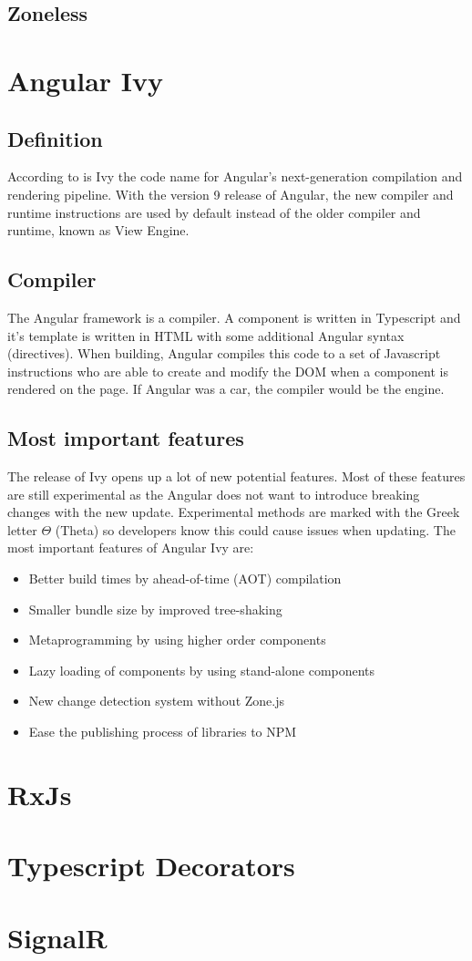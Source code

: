 \subsection{Zoneless}

\section{Angular Ivy}
\subsection{Definition}
According to \textcite{Angular.io-ivy} is Ivy the code name for Angular's next-generation compilation and rendering pipeline. With the version 9 release of Angular, the new compiler and runtime instructions are used by default instead of the older compiler and runtime, known as View Engine.

\subsection{Compiler}
The Angular framework is a compiler. A component is written in Typescript and it's template is written in HTML with some additional Angular syntax (directives). When building, Angular compiles this code to a set of Javascript instructions who are able to create and modify the DOM when a component is rendered on the page. If Angular was a car, the compiler would be the engine.

\subsection{Most important features}
The release of Ivy opens up a lot of new potential features. Most of these features are still experimental as the Angular does not want to introduce breaking changes with the new update. Experimental methods are marked with the Greek letter \(\Theta\) (Theta) so developers know this could cause issues when updating. The most important features of Angular Ivy are:
\begin{itemize}
    \item Better build times by ahead-of-time (AOT) compilation
    \item Smaller bundle size by improved tree-shaking
    \item Metaprogramming by using higher order components \autocite{Savkin2018}
    \item Lazy loading of components by using stand-alone components
    \item New change detection system without Zone.js
    \item Ease the publishing process of libraries to NPM
\end{itemize}

\autocite{Exbrayat2019}


\section{RxJs}

\section{Typescript Decorators}

\section{SignalR}
